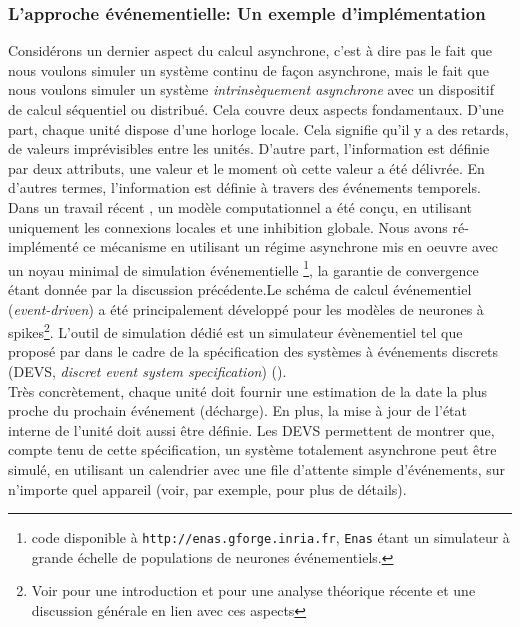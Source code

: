 \subsubsection{L'approche événementielle: Un exemple d'implémentation}

Considérons un dernier aspect du calcul asynchrone, c'est à dire pas le fait que nous voulons simuler un système continu de façon asynchrone, mais le fait que nous voulons simuler un système {\em intrinsèquement asynchrone} avec un dispositif de calcul séquentiel ou distribué. Cela couvre deux aspects fondamentaux. D'une part, chaque unité dispose d'une horloge locale. Cela signifie qu'il y a des retards, de valeurs imprévisibles entre les unités. D'autre part, l'information est définie par deux attributs, une valeur et le moment où cette valeur a été délivrée. En d'autres termes, l'information est définie à travers des événements temporels.\\

Dans un travail récent \cite {Rougier:2006}, un modèle computationnel a été conçu, en utilisant uniquement les connexions locales et une inhibition globale. 
Nous avons ré-implémenté ce mécanisme en utilisant un régime asynchrone mis en oeuvre avec un noyau minimal de simulation événementielle \footnote {code disponible à {\tt http://enas.gforge.inria.fr}, {\tt Enas} étant un simulateur à grande échelle de populations de neurones événementiels.}, la garantie de convergence étant donnée par la discussion précédente.Le schéma de calcul événementiel (\textit{event-driven}) a été principalement développé pour les modèles de neurones à spikes\footnote {Voir \cite {Gerstner:2002} pour une introduction et \cite {Cessac:2008, Cessac:2010} pour une analyse théorique récente et une discussion générale en lien avec ces aspects}.  L'outil de simulation dédié est un simulateur évènementiel tel que proposé par \cite{Rochel:2003} dans le cadre de la spécification des systèmes à événements discrets (DEVS, \textit{discret event system specification}) (\cite {Brette:2007, Cessac:2009}). \\

Très concrètement, chaque unité doit fournir une estimation de la date la plus proche du prochain événement (décharge). En plus, la mise à jour de l'état interne de l'unité doit aussi être définie. Les DEVS permettent de montrer que, compte tenu de cette spécification, un système totalement asynchrone peut être simulé, en utilisant un calendrier avec une file d'attente simple d'événements, sur n'importe quel appareil (voir, par exemple, \cite{Cessac:2009} pour plus de détails).\\%

